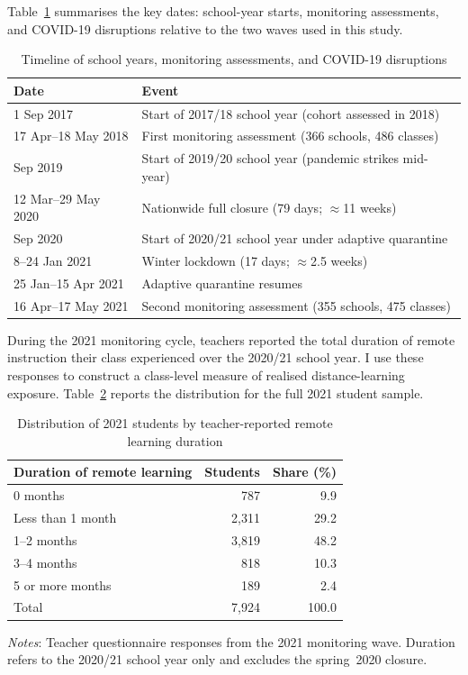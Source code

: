 Table~\ref{tab:timeline} summarises the key dates: school-year starts,
monitoring assessments, and COVID-19 disruptions relative to the two waves
used in this study.

\begin{table}[htbp]
\centering
\caption{Timeline of school years, monitoring assessments, and COVID-19 disruptions}
\label{tab:timeline}
\begin{tabular}{ll}
\toprule
\textbf{Date} & \textbf{Event} \\
\midrule
1 Sep 2017          & Start of 2017/18 school year (cohort assessed in 2018) \\
17 Apr--18 May 2018 & First monitoring assessment (366 schools, 486 classes) \\
\addlinespace
1 Sep 2019          & Start of 2019/20 school year (pandemic strikes mid-year) \\
12 Mar--29 May 2020 & Nationwide full closure (79 days; $\approx$11 weeks) \\
\addlinespace
1 Sep 2020          & Start of 2020/21 school year under adaptive quarantine \\
8--24 Jan 2021      & Winter lockdown (17 days; $\approx$2.5 weeks) \\
25 Jan--15 Apr 2021 & Adaptive quarantine resumes \\
16 Apr--17 May 2021 & Second monitoring assessment (355 schools, 475 classes) \\
\bottomrule
\end{tabular}
\end{table}

During the 2021 monitoring cycle, teachers reported the total duration of remote
instruction their class experienced over the 2020/21 school year. I use these
responses to construct a class-level measure of realised distance-learning exposure.
Table~\ref{tab:remote_dist} reports the distribution for the full 2021 student sample.

\begin{table}[htbp]
\centering
\caption{Distribution of 2021 students by teacher-reported remote learning duration}
\label{tab:remote_dist}
\begin{tabular}{lrr}
\toprule
\textbf{Duration of remote learning} & \textbf{Students} & \textbf{Share (\%)} \\
\midrule
0 months          &   787 &  9.9 \\
Less than 1 month & 2,311 & 29.2 \\
1--2 months       & 3,819 & 48.2 \\
3--4 months       &   818 & 10.3 \\
5 or more months  &   189 &  2.4 \\
\midrule
Total             & 7,924 & 100.0 \\
\bottomrule
\end{tabular}
\begin{tablenotes}
\small
\item \textit{Notes}: Teacher questionnaire responses from the 2021 monitoring wave.
Duration refers to the 2020/21 school year only and excludes the spring~2020 closure.
\end{tablenotes}
\end{table}

